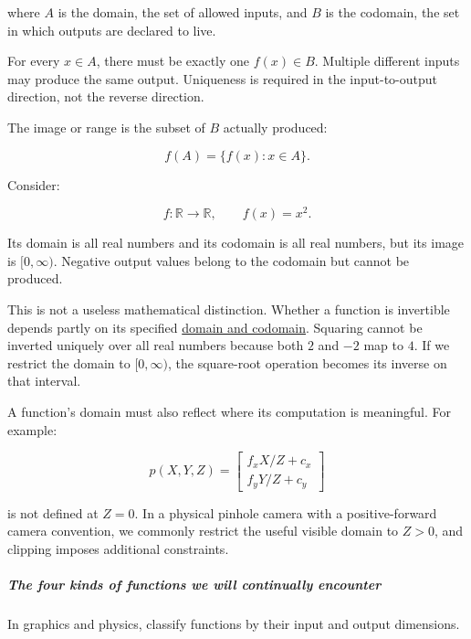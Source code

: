 where \(A\) is the domain, the set of allowed inputs, and \(B\) is the codomain, the set in which outputs are declared to live.

For every \(x\in A\), there must be exactly one \(f(x)\in B\). Multiple different inputs may produce the same output. Uniqueness is required in the input-to-output direction, not the reverse direction.

The image or range is the subset of \(B\) actually produced:

\[
f(A)=\{f(x):x\in A\}.
\]

Consider:

\[
f:\mathbb R\rightarrow\mathbb R,\qquad f(x)=x^2.
\]

Its domain is all real numbers and its codomain is all real numbers, but its image is \([0,\infty)\). Negative output values belong to the codomain but cannot be produced.

This is not a useless mathematical distinction. Whether a function is invertible depends partly on its specified \hyperref[01-foundations-i-ch020-functions-limits-continuity-and-scalar-change]{domain and codomain}. Squaring cannot be inverted uniquely over all real numbers because both \(2\) and \(-2\) map to \(4\). If we restrict the domain to \([0,\infty)\), the square-root operation becomes its inverse on that interval.

A function's domain must also reflect where its computation is meaningful. For example:

\[
p(X,Y,Z)= \begin{bmatrix} f_xX/Z+c_x\\ f_yY/Z+c_y \end{bmatrix}
\]

is not defined at \(Z=0\). In a physical pinhole camera with a positive-forward camera convention, we commonly restrict the useful visible domain to \(Z>0\), and clipping imposes additional constraints.

\subparagraph{The four kinds of functions we will continually encounter}\label{01-foundations-i-ch020-the-four-kinds-of-functions-we-will-continually-encounter}

In graphics and physics, classify functions by their input and output dimensions.

